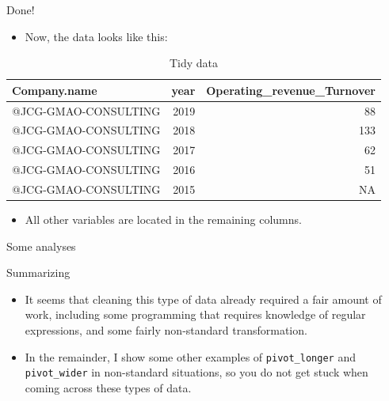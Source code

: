 \documentclass[10pt,ignorenonframetext,]{beamer}
\providecommand{\tightlist}{%
  \setlength{\itemsep}{0pt}\setlength{\parskip}{0pt}}
\begin{document}
\begin{frame}{Done!}
\protect\hypertarget{done-1}{}

\begin{itemize}
\tightlist
\item
  Now, the data looks like this:
\end{itemize}

\begin{table}

\caption{\label{tab:unnamed-chunk-25}Tidy data}
\centering
\begin{tabular}[t]{lrr}
\toprule
Company.name & year & Operating\_revenue\_Turnover\\
\midrule
\rowcolor{gray!6}  @JCG-GMAO-CONSULTING & 2019 & 88\\
@JCG-GMAO-CONSULTING & 2018 & 133\\
\rowcolor{gray!6}  @JCG-GMAO-CONSULTING & 2017 & 62\\
@JCG-GMAO-CONSULTING & 2016 & 51\\
\rowcolor{gray!6}  @JCG-GMAO-CONSULTING & 2015 & NA\\
\bottomrule
\end{tabular}
\end{table}

\begin{itemize}
\tightlist
\item
  All other variables are located in the remaining columns.
\end{itemize}

\end{frame}

\begin{frame}{Some analyses}
\protect\hypertarget{some-analyses}{}

\end{frame}

\begin{frame}[fragile]{Summarizing}
\protect\hypertarget{summarizing}{}

\begin{itemize}
\item
  It seems that cleaning this type of data already required a fair
  amount of work, including some programming that requires knowledge of
  regular expressions, and some fairly non-standard transformation.
\item
  In the remainder, I show some other examples of \texttt{pivot\_longer}
  and \texttt{pivot\_wider} in non-standard situations, so you do not
  get stuck when coming across these types of data.
\end{itemize}

\end{frame}
\end{document}
